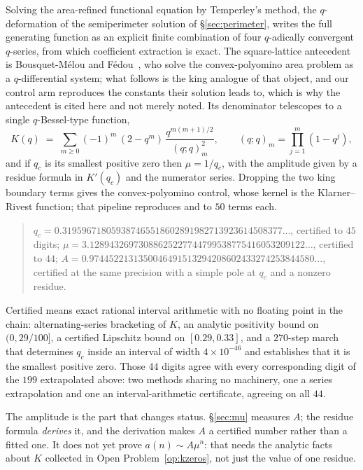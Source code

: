 \documentclass[11pt]{article}
\begin{document}
Solving the area-refined functional equation by Temperley's method, the
$q$-deformation of the semiperimeter solution of \S\ref{sec:perimeter},
writes the full generating function as an explicit finite combination of four
$q$-adically convergent $q$-series, from which coefficient extraction is exact.
The square-lattice antecedent is Bousquet-M\'elou and
F\'edou~\cite{bousquetMelouFedou1995}, who solve the convex-polyomino area
problem as a $q$-differential system; what follows is the king analogue of that
object, and our control arm reproduces the constants their solution leads to,
which is why the antecedent is cited here and not merely noted.
Its denominator telescopes to a single $q$-Bessel-type function,
\[
  K(q) \;=\; \sum_{m \ge 0} (-1)^m\,(2 - q^m)\,
             \frac{q^{m(m+1)/2}}{(q;q)_m^{2}},
  \qquad (q;q)_m = \prod_{j=1}^{m}(1 - q^{j}),
\]
and if $q_c$ is its smallest positive zero then $\mu = 1/q_c$, with the
amplitude given by a residue formula in $K'(q_c)$ and the numerator series.
Dropping the two king boundary terms gives the convex-polyomino control, whose
kernel is the Klarner--Rivest function; that pipeline reproduces 
and  to $50$ terms each.

\begin{quote}\small
$q_c = 0.319596718059387465518602891982713923614508377\dots$, certified to $45$
digits; $\mu = 3.12894326973088625227744799538775416053209122\dots$, certified
to $44$; $A = 0.9744522131350046491513294208602433274253844580\dots$, certified
at the same precision with a simple pole at $q_c$ and a nonzero residue.
\end{quote}

Certified means exact rational interval arithmetic with no floating point in
the chain: alternating-series bracketing of $K$, an analytic positivity bound on
$(0, 29/100]$, a certified Lipschitz bound on $[0.29, 0.33]$, and a $270$-step
march that determines $q_c$ inside an interval of width $4\times10^{-46}$ and
establishes that it is the smallest positive zero. Those $44$ digits agree with
every corresponding digit of the $199$ extrapolated above: two methods sharing
no machinery, one a series extrapolation and one an interval-arithmetic
certificate, agreeing on all $44$.

The amplitude is the part that changes status. \S\ref{sec:mu} measures $A$; the
residue formula \emph{derives} it, and the derivation makes $A$ a certified
number rather than a fitted one. It does not yet prove
$a(n) \sim A\mu^n$: that needs the analytic facts about $K$ collected in
Open Problem~\ref{op:kzeros}, not just the value of one residue.
\end{document}
